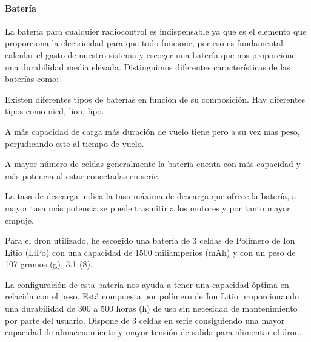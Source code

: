 \paragraph{Batería}
\label{SSS:Bateria}

 La batería para cualquier radiocontrol es indispensable ya que es el elemento que proporciona la electricidad para que todo funcione, por eso es fundamental calcular el gasto de nuestro sistema y escoger una batería que nos proporcione una durabilidad media elevada.
 Distinguimos diferentes características de las baterías como:
 
 \begin{description}
 \item[Composición: ]  Existen diferentes tipos de baterías en función de su composición. Hay diferentes tipos como \acl{nicd}, \acl{lion}, \acl{lipo}.
 \item[Capacidad: ] A más capacidad de carga más duración de vuelo tiene pero a su vez mas peso, perjudicando este al tiempo de vuelo.
 \item[Número de celdas: ] A mayor número de celdas generalmente la batería cuenta con más capacidad y más potencia al estar conectadas en serie.
 \item[Tasa de descarga: ] La tasa de descarga indica la tasa máxima de descarga que ofrece la batería, a mayor tasa más potencia se puede trasmitir a los motores y por tanto mayor empuje. 
 \end{description}

Para el dron utilizado, he escogido una batería de 3 celdas de Polímero de Ion Litio (LiPo) con una capacidad de 1500 miliamperios (mAh) y con un peso de 107 gramos (g), 3.1 (8). 


La configuración de esta batería nos ayuda a tener una capacidad óptima en relación con el peso. 
Está compuesta por polímero de Ion Litio proporcionando una durabilidad de 300 a 500 horas (h) de uso sin necesidad de mantenimiento por parte del usuario. 
Dispone de 3 celdas en serie consiguiendo una mayor capacidad de almacenamiento y mayor tensión de salida para alimentar el dron.


	
